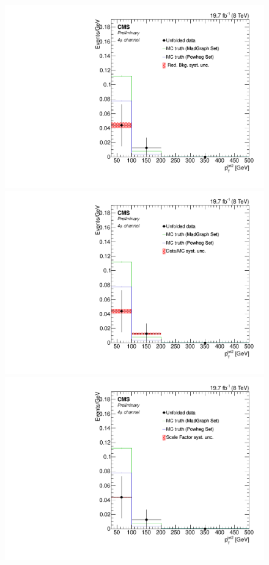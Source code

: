 \begin{figure}[hbtp]
\begin{center}
   \includegraphics[width=0.8\cmsFigWidth]{Figures/Unfolding/Systematics/ZZTo4m_PtJet2_RedBkg_Mad_fr}     
  \includegraphics[width=0.8\cmsFigWidth]{Figures/Unfolding/Systematics/ZZTo4m_PtJet2_UnfDataOverGenMC_Mad_fr}     
   \includegraphics[width=0.8\cmsFigWidth]{Figures/Unfolding/Systematics/ZZTo4m_PtJet2_SFSq_Mad_fr}

\end{center}
\end{figure}
